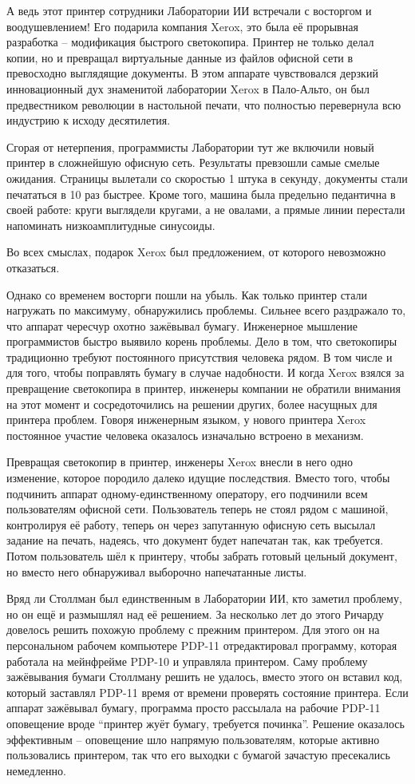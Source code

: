 А ведь этот принтер сотрудники Лаборатории ИИ встречали с восторгом и воодушевлением! Его подарила компания Xerox, это была её прорывная разработка -- модификация быстрого светокопира. Принтер не только делал копии, но и превращал виртуальные данные из файлов офисной сети в превосходно выглядящие документы. В этом аппарате чувствовался дерзкий инновационный дух знаменитой лаборатории Xerox в Пало-Альто, он был предвестником революции в настольной печати, что полностью перевернула всю индустрию к исходу десятилетия.

Сгорая от нетерпения, программисты Лаборатории тут же включили новый принтер в сложнейшую офисную сеть. Результаты превзошли самые смелые ожидания. Страницы вылетали со скоростью 1 штука в секунду, документы стали печататься в 10 раз быстрее. Кроме того, машина была предельно педантична в своей работе: круги выглядели кругами, а не овалами, а прямые линии перестали напоминать низкоамплитудные синусоиды.

Во всех смыслах, подарок Xerox был предложением, от которого невозможно отказаться.

Однако со временем восторги пошли на убыль. Как только принтер стали нагружать по максимуму, обнаружились проблемы. Сильнее всего раздражало то, что аппарат чересчур охотно зажёвывал бумагу. Инженерное мышление программистов быстро выявило корень проблемы. Дело в том, что светокопиры традиционно требуют постоянного присутствия человека рядом. В том числе и для того, чтобы поправлять бумагу в случае надобности. И когда Xerox взялся за превращение светокопира в принтер, инженеры компании не обратили внимания на этот момент и сосредоточились на решении других, более насущных для принтера проблем. Говоря инженерным языком, у нового принтера Xerox постоянное участие человека оказалось изначально встроено в механизм.

Превращая светокопир в принтер, инженеры Xerox внесли в него одно изменение, которое породило далеко идущие последствия. Вместо того, чтобы подчинить аппарат одному-единственному оператору, его подчинили всем пользователям офисной сети. Пользователь теперь не стоял рядом с машиной, контролируя её работу, теперь он через запутанную офисную сеть высылал задание на печать, надеясь, что документ будет напечатан так, как требуется. Потом пользователь шёл к принтеру, чтобы забрать готовый цельный документ, но вместо него обнаруживал выборочно напечатанные листы.

Вряд ли Столлман был единственным в Лаборатории ИИ, кто заметил проблему, но он ещё и размышлял над её решением. За несколько лет до этого Ричарду довелось решить похожую проблему с прежним принтером. Для этого он на персональном рабочем компьютере PDP-11 отредактировал программу, которая работала на мейнфрейме PDP-10 и управляла принтером. Саму проблему зажёвывания бумаги Столлману решить не удалось, вместо этого он вставил код, который заставлял PDP-11 время от времени проверять состояние принтера. Если аппарат зажёвывал бумагу, программа просто рассылала на рабочие PDP-11 оповещение вроде \enquote{принтер жуёт бумагу, требуется починка}. Решение оказалось эффективным -- оповещение шло напрямую пользователям, которые активно пользовались принтером, так что его выходки с бумагой зачастую пресекались немедленно.

